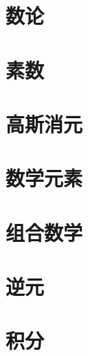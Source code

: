 \section{数论}


\section{素数}


\section{高斯消元}


\section{数学元素}


\section{组合数学}


\section{逆元}


\section{积分}

